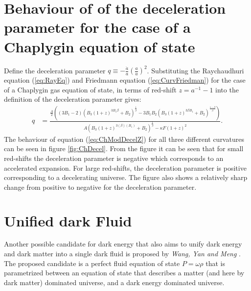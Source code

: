 \documentclass[a0,portrait]{a0poster}
\newcommand{\brac}[1]{\left(#1\right)}
\begin{document}
\begin{multicols}{2}
\section*{Behaviour of of the deceleration parameter for the case of a Chaplygin equation of state}
Define the deceleration parameter $q\equiv -\frac{\ddot{a}}{a}\brac{\frac{a}{\dot{a}}}^{2}$. Substituting the Raychaudhuri equation (\ref{eq:RayEq}) and Friedmann equation (\ref{eq:CurvFriedman}) for the case of a Chaplygin gas equation of state, in terms of red-shift $z=a^{-1}-1$ into the definition of the deceleration parameter gives:
\begin{equation}\label{eq:ChModDecelZ}
\begin{split}
q &= \frac{\frac{A}{2}\brac{\brac{3B_{1}-2}\brac{B_{3}\brac{1+z}^{3B_{1}\beta}+B_{2}}^{\frac{1}{\beta}}-3B_{1}B_{2}\brac{B_{3}\brac{1+z}^{3\beta B_{1}}+B_{2}}^{\frac{1-\beta}{\beta}}}}{A\brac{B_{3}\brac{1+z}^{3\brac{\beta}\brac{B_{1}}}+B_{2}}^{\frac{1}{\beta}} -\kappa F\brac{1+z}^{2}}.
\end{split}
\end{equation}
The behaviour of equation (\ref{eq:ChModDecelZ}) for all three different curvatures can be seen in figure \ref{fig:ChDecel}. 
From the figure it can be seen that for small red-shifts the deceleration parameter is negative which corresponds to an accelerated expansion. For large red-shifts, the deceleration parameter is positive corresponding to a decelerating universe. The figure also shows a relatively sharp change from positive to negative for the deceleration parameter.

\color{DarkSlateGray} %
\section*{Unified dark Fluid}
Another possible candidate for dark energy that also aims to unify dark energy and dark matter into a single dark fluid is proposed by \textit{Wang, Yan and Meng} \citep{wang2017new}. The proposed candidate is a perfect fluid equation of state $P=\omega\rho$ that is parametrized between an equation of state that describes a matter (and here by dark matter) dominated universe, and a dark energy dominated universe. 


\end{multicols}
\end{document}
